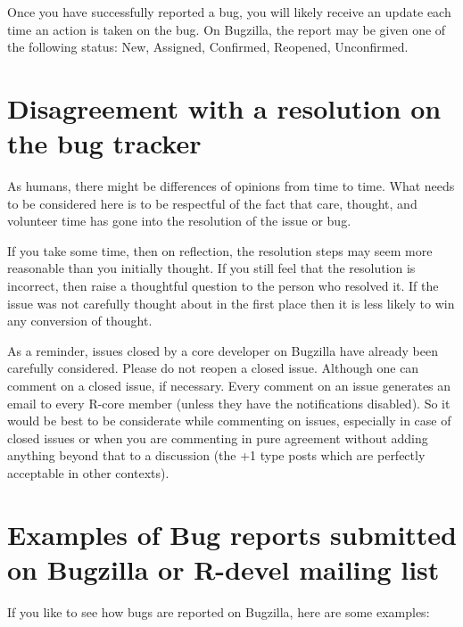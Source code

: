 \documentclass[
]{book}
\begin{document}
Once you have successfully reported a bug, you will likely receive an update each time an action is taken on the bug. On Bugzilla, the report may be given one of the following status: New, Assigned, Confirmed, Reopened, Unconfirmed.

\hypertarget{disagreement-with-a-resolution-on-the-bug-tracker}{%
\section{Disagreement with a resolution on the bug tracker}\label{disagreement-with-a-resolution-on-the-bug-tracker}}

As humans, there might be differences of opinions from time to time. What needs to be considered here is to be respectful of the fact that care, thought, and volunteer time has gone into the resolution of the issue or bug.

If you take some time, then on reflection, the resolution steps may seem more reasonable than you initially thought. If you still feel that the resolution is incorrect, then raise a thoughtful question to the person who resolved it. If the issue was not carefully thought about in the first place then it is less likely to win any conversion of thought.

As a reminder, issues closed by a core developer on Bugzilla have already been carefully considered. Please do not reopen a closed issue. Although one can comment on a closed issue, if necessary. Every comment on an issue generates an email to every R-core member (unless they have the notifications disabled). So it would be best to be considerate while commenting on issues, especially in case of closed issues or when you are commenting in pure agreement without adding anything beyond that to a discussion (the +1 type posts which are perfectly acceptable in other contexts).

\hypertarget{examples-of-bug-reports-submitted-on-bugzilla-or-r-devel-mailing-list}{%
\section{Examples of Bug reports submitted on Bugzilla or R-devel mailing list}\label{examples-of-bug-reports-submitted-on-bugzilla-or-r-devel-mailing-list}}

If you like to see how bugs are reported on Bugzilla, here are some examples:
\end{document}

